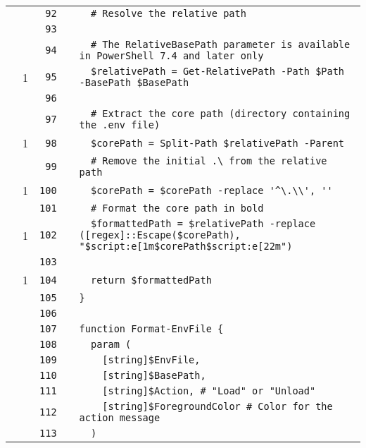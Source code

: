 \documentclass[a4paper,landscape,10pt]{article}
\begin{document}
\begin{longtable}[l]{lrrll}
\cellcolor{gray} &  & \verb~92~ & & \verb~  # Resolve the relative path~\\
\cellcolor{gray} &  & \verb~93~ & & \verb~~\\
\cellcolor{gray} &  & \verb~94~ & & \verb~  # The RelativeBasePath parameter is available in PowerShell 7.4 and later only~\\
\cellcolor{green} & 1 & \verb~95~ & & \verb~  $relativePath = Get-RelativePath -Path $Path -BasePath $BasePath~\\
\cellcolor{gray} &  & \verb~96~ & & \verb~~\\
\cellcolor{gray} &  & \verb~97~ & & \verb~  # Extract the core path (directory containing the .env file)~\\
\cellcolor{green} & 1 & \verb~98~ & & \verb~  $corePath = Split-Path $relativePath -Parent~\\
\cellcolor{gray} &  & \verb~99~ & & \verb~  # Remove the initial .\ from the relative path~\\
\cellcolor{green} & 1 & \verb~100~ & & \verb~  $corePath = $corePath -replace '^\.\\', ''~\\
\cellcolor{gray} &  & \verb~101~ & & \verb~  # Format the core path in bold~\\
\cellcolor{green} & 1 & \verb~102~ & & \verb~  $formattedPath = $relativePath -replace ([regex]::Escape($corePath), "$script:e[1m$corePath$script:e[22m")~\\
\cellcolor{gray} &  & \verb~103~ & & \verb~~\\
\cellcolor{green} & 1 & \verb~104~ & & \verb~  return $formattedPath~\\
\cellcolor{gray} &  & \verb~105~ & & \verb~}~\\
\cellcolor{gray} &  & \verb~106~ & & \verb~~\\
\cellcolor{gray} &  & \verb~107~ & & \verb~function Format-EnvFile {~\\
\cellcolor{gray} &  & \verb~108~ & & \verb~  param (~\\
\cellcolor{gray} &  & \verb~109~ & & \verb~    [string]$EnvFile,~\\
\cellcolor{gray} &  & \verb~110~ & & \verb~    [string]$BasePath,~\\
\cellcolor{gray} &  & \verb~111~ & & \verb~    [string]$Action, # "Load" or "Unload"~\\
\cellcolor{gray} &  & \verb~112~ & & \verb~    [string]$ForegroundColor # Color for the action message~\\
\cellcolor{gray} &  & \verb~113~ & & \verb~  )~\\

\end{longtable}
\end{document}
